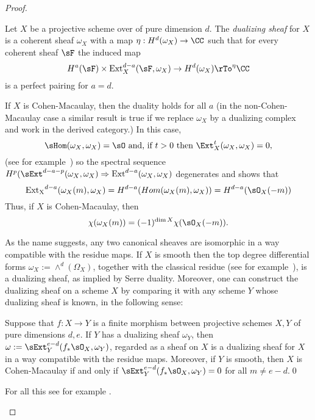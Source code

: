 \begin{proof}
\begin{definition}
Let $X$ be a projective scheme over of pure dimension $d$. The \emph{dualizing sheaf} for $X$ is a coherent sheaf $\omega_X$ 
with a map $\eta: H^d(\omega_X) \to \CC$ such that for every coherent sheaf  $\sF$ the induced map
$$
H^a(\sF) \times { \rm Ext}_X^{d-a}(\sF, \omega_X) \to H^d(\omega_X) \rTo^\eta \CC
$$
is a perfect pairing for $a=d$. 
\end{definition}


\begin{fact}
If $X$ is Cohen-Macaulay, then the duality holds for all $a$ (in the non-Cohen-Macaulay case a similar result is true if we replace $\omega_X$ by a dualizing complex
and work in the derived category.) In this case, 
$$
\sHom(\omega_X, \omega_X) = \sO \hbox{ and, if $t>0$ then } \Ext_X^{t}(\omega_X, \omega_X) = 0,
$$
(see for example~\cite[Theorem[Theorems 3.3.4 and 3.3.10d]{BrunsHerzog}) so the spectral sequence $H^p(\sExt^{d-a-p}(\omega_X, \omega_X) \Rightarrow {\rm Ext}^{d-a}(\omega_X, \omega_X)$ degenerates and shows that 
$$
{\rm Ext_X}^{d-a}(\omega_X(m), \omega_X) = H^{d-a}(Hom(\omega_X(m), \omega_X)) = H^{d-a}(\sO_X(-m))
$$
Thus, if $X$ is Cohen-Macaulay, then 
$$
\chi(\omega_X(m)) =(-1)^{\dim X}\chi(\sO_X(-m)).
$$

As the name suggests, any two canonical sheaves are isomorphic in a way compatible with the
residue maps. If $X$ is smooth then the top degree differential forms $\omega_X :=\wedge^d(\Omega_X)$,
together with the classical residue (see for example~\cite[p. 648, 708]{Griffiths-Harris1978}), is a dualizing sheaf, as implied by Serre duality. Moreover, one can construct the dualizing sheaf on a scheme
$X$ by comparing it with any scheme $Y$ whose dualizing sheaf is known, in the following sense:

\begin{theorem}\label{omega}
Suppose that $f: X\to Y$ is a finite morphism between projective schemes $X,Y$ of pure dimensions $d,e$. If $Y$ has a dualizing sheaf $\omega_Y$,
then $\omega := \sExt_Y^{e-d}(f_*\sO_X,  \omega_Y)$, regarded as a sheaf on $X$ is a dualizing sheaf for $X$ in a way compatible with the residue maps.
Moreover, if $Y$ is smooth, then $X$ is Cohen-Macaulay if and only if $ \sExt_Y^{e-d}(f_*\sO_X,  \omega_Y)= 0$ for all $m\neq e-d$.\qed
\end{theorem}

For all this see for example \cite{AltmanKleiman}.
\end{fact}


\end{proof}

